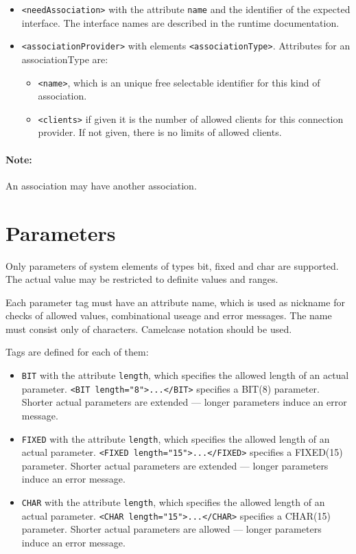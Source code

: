\begin{itemize}
\item \verb|<needAssociation>| with the attribute 
 \verb|name| and the identifier of the expected interface. The 
  interface names are described in the runtime documentation. 
\item \verb|<associationProvider>|  with elements \verb|<associationType>|.
  Attributes for an associationType are:
  \begin{itemize}
   \item  \verb|<name>|,  which is an unique free selectable
     identifier for this kind of  association.
   \item \verb|<clients>|  if given it is the number of allowed
      clients for this connection provider. If not given, there is no
      limits of allowed clients.
   \end{itemize} 
\end{itemize}

\paragraph{Note:} An association may have another association.
 
\section{Parameters}
Only parameters of system elements of types bit, fixed and char are supported.
The actual value may be restricted to definite values and ranges.

Each parameter tag must have an attribute name, which is used as nickname 
for checks of allowed values, combinational useage and error messages.
The name must consist only of characters. Camelcase notation should be used.

Tags are defined for each of them:
\begin{itemize}
\item \verb|BIT| with the attribute \verb|length|, which specifies the 
   allowed length of an actual parameter. \verb|<BIT length="8">...</BIT>|
   specifies a BIT(8) parameter. Shorter actual parameters are extended --- 
   longer parameters induce an error message.
\item \verb|FIXED| with the attribute \verb|length|, which specifies the 
   allowed length of an actual parameter. \verb|<FIXED length="15">...</FIXED>|
   specifies a FIXED(15) parameter. Shorter actual parameters are extended --- 
   longer parameters induce an error message.
\item \verb|CHAR| with the attribute \verb|length|, which specifies the 
   allowed length of an actual parameter. \verb|<CHAR length="15">...</CHAR>|
   specifies a CHAR(15) parameter. Shorter actual parameters are allowed --- 
   longer parameters induce an error message.
\end{itemize}

